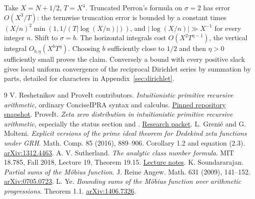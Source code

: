 \documentclass[11pt]{article}
\begin{document}
Take \(X=N+1/2\), \(T=X^4\). Truncated Perron's formula on \(\sigma=2\) has error \(O(X^3/T)\): the termwise truncation error is bounded by a constant times \((X/n)^2\min(1,1/(T|\log(X/n)|))\), and \(|\log(X/n)|\gg X^{-1}\) for every integer \(n\). Shift to \(\sigma=b\). The horizontal integrals cost \(O(X^2 T^{\eta-1})\), the vertical integral \(O_{b,\eta}(X^bT^\eta)\). Choosing \(b\) sufficiently close to \(1/2\) and then \(\eta>0\) sufficiently small proves the claim. Conversely a bound with every positive slack gives local uniform convergence of the reciprocal Dirichlet series by summation by parts, detailed for characters in Appendix~\ref{sec:dirichlet}.


\begin{thebibliography}{9}\small
{} V. Reshetnikov and ProveIt contributors. \emph{Intuitionistic primitive recursive arithmetic}, ordinary ConciseIPRA syntax and calculus. \href{https://github.com/VladimirReshetnikov/ProveIt/tree/ce0e3ceaf41a83e653857e5f60e0460733cc230c/Logic/PrimitiveRecursiveArithmetic}{Pinned repository snapshot}.
 ProveIt. \emph{Zeta zero distribution in intuitionistic primitive recursive arithmetic}, especially the status section and . \href{https://github.com/VladimirReshetnikov/ProveIt/tree/ce0e3ceaf41a83e653857e5f60e0460733cc230c/Logic/PrimitiveRecursiveArithmetic/docs/proofs/analytic-number-theory/zeta_zeros_ipra_2026-11-15}{Research packet}.
 L. Greni\'e and G. Molteni. \emph{Explicit versions of the prime ideal theorem for Dedekind zeta functions under GRH}. Math. Comp. 85 (2016), 889--906. Corollary 1.2 and equation (2.3). \href{https://arxiv.org/abs/1312.4463}{arXiv:1312.4463}.
 A. V. Sutherland. \emph{The analytic class number formula}. MIT 18.785, Fall 2018, Lecture 19, Theorem 19.15. \href{https://math.mit.edu/classes/18.785/2018fa/LectureNotes19.pdf}{Lecture notes}.
 K. Soundararajan. \emph{Partial sums of the M\"obius function}. J. Reine Angew. Math. 631 (2009), 141--152. \href{https://arxiv.org/abs/0705.0723}{arXiv:0705.0723}.
 L. Ye. \emph{Bounding sums of the M\"obius function over arithmetic progressions}. Theorem 1.1. \href{https://arxiv.org/abs/1406.7326}{arXiv:1406.7326}.
\end{thebibliography}
\end{document}
